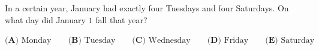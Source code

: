 In a certain year, January had exactly four Tuesdays and four Saturdays. On what day did January $1$ fall that year?

$\textbf{(A) }\text{Monday}\qquad\textbf{(B) }\text{Tuesday}\qquad\textbf{(C) }\text{Wednesday}\qquad\textbf{(D) }\text{Friday}\qquad\textbf{(E) }\text{Saturday}$
